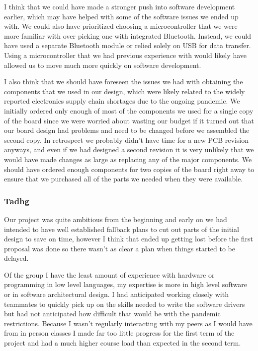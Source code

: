 I think that we could have made a stronger push into software development
earlier, which may have helped with some of the software issues we ended up
with. We could also have prioritized choosing a microcontroller that we were
more familiar with over picking one with integrated Bluetooth. Instead, we could
have used a separate Bluetooth module or relied solely on USB for data transfer.
Using a microcontroller that we had previous experience with would likely have
allowed us to move much more quickly on software development.

I also think that we should have foreseen the issues we had with obtaining the
components that we used in our design, which were likely related to the widely
reported electronics supply chain shortages due to the ongoing pandemic. We
initially ordered only enough of most of the components we used for a single
copy of the board since we were worried about wasting our budget if it turned
out that our board design had problems and need to be changed before we
assembled the second copy. In retrospect we probably didn't have time for a new
PCB revision anyways, and even if we had designed a second revision it is very
unlikely that we would have made changes as large as replacing any of the major
components. We should have ordered enough components for two copies of the
board right away to ensure that we purchased all of the parts we needed when
they were available.

\subsubsection{Tadhg}

Our project was quite ambitious from the beginning and early on we had intended to have 
well established fallback plans to cut out parts of the initial design to save on time,
however I think that ended up getting lost before the first proposal was done so there wasn't
as clear a plan when things started to be delayed.

Of the group I have the least amount of experience with hardware or programming in low level
languages, my expertise is more in high level software or in software architectural design.
I had anticipated working closely with teammates to quickly pick up on the skills needed to 
write the software drivers but had not anticipated how difficult that would be with the pandemic
restrictions.  Because I wasn't regularly interacting with my peers as I would have from in person
classes I made far too little progress for the first term of the project and had a much higher
course load than expected in the second term.  

